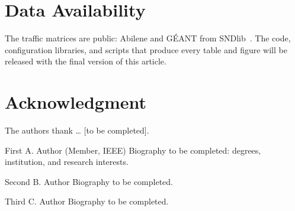 \documentclass[journal]{IEEEtran}
\begin{document}
\section*{Data Availability}
The traffic matrices are public: Abilene and G\'{E}ANT from SNDlib~\cite{orlowski2010sndlib,uhlig2006geant,zhang2003tomogravity}. The code, configuration libraries, and scripts that produce every table and figure will be released with the final version of this article.

\section*{Acknowledgment}
The authors thank \ldots{} [to be completed].




\begin{IEEEbiographynophoto}{First A. Author}
(Member, IEEE) Biography to be completed: degrees, institution, and research interests.
\end{IEEEbiographynophoto}

\begin{IEEEbiographynophoto}{Second B. Author}
Biography to be completed.
\end{IEEEbiographynophoto}

\begin{IEEEbiographynophoto}{Third C. Author}
Biography to be completed.
\end{IEEEbiographynophoto}
\end{document}
